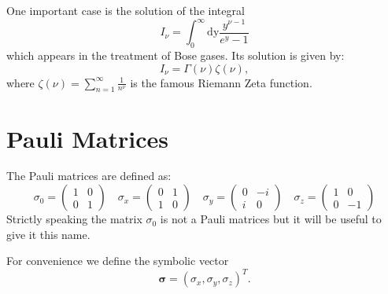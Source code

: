 \documentclass[11pt]{book}
\renewcommand{\vec}[1]{\bm{#1}}
\begin{document}
One important case is the solution of the integral \[I_{\nu} = \int_0^{\infty} \text{dy} \frac{y^{\nu-1}}{e^y -1}\] which appears in the treatment of Bose gases. Its solution is given by: \[ I_{\nu} = \Gamma(\nu) \zeta(\nu),\] where $ \zeta(\nu) = \sum_{n=1}^{\infty} \frac{1}{n^{\nu}} $ is the famous Riemann Zeta function.

\clearpage
\newpage

\chapter{Pauli Matrices}
The Pauli matrices are defined as:
\begin{equation}
  \sigma_0=\begin{pmatrix}
                1 & 0\\
                0 & 1
            \end{pmatrix}
  \quad
  \sigma_x= \begin{pmatrix}
                0 & 1\\
                1 & 0
            \end{pmatrix}
  \quad
  \sigma_y= \begin{pmatrix}
                0 & -i\\
                i & 0
            \end{pmatrix}
  \quad
  \sigma_z = \begin{pmatrix}
                1 & 0\\
                0 & -1
            \end{pmatrix}
\end{equation}
Strictly speaking the matrix $\sigma_0$ is not a Pauli matrices but it will be useful to give it this name.

For convenience we define the symbolic vector
\begin{equation}
      \vec{\sigma} = \left(\sigma_x, \sigma_y,\sigma_z \right)^T.
\end{equation}
\end{document}
